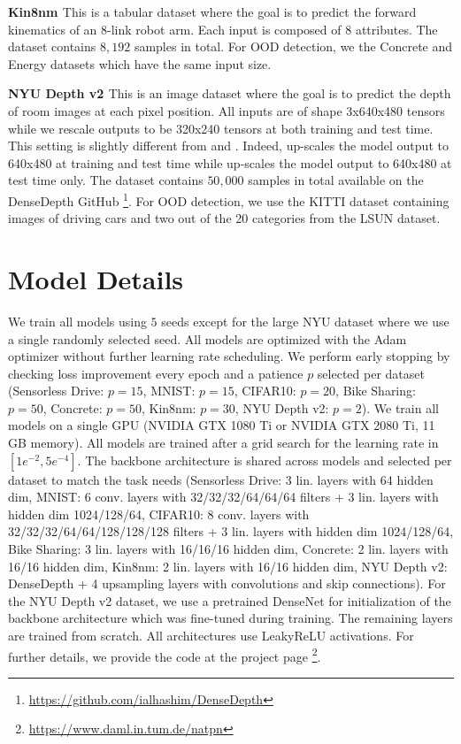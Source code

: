 \textbf{Kin8nm \citep{uci}} This is a tabular dataset where the goal is to predict the forward kinematics of an 8-link robot arm. Each input is composed of $8$ attributes. The dataset contains $8,192$ samples in total. For OOD detection, we the Concrete and Energy datasets which have the same input size.

\textbf{NYU Depth v2 \citep{nyu-depth}} This is an image dataset where the goal is to predict the depth of room images at each pixel position. All inputs are of shape 3x640x480 tensors while we rescale outputs to be 320x240 tensors at both training and test time. This setting is slightly different from \citet{uncertainty-bayesian-computer-vision} and \citet{nyu-depth}. Indeed, \citep{uncertainty-bayesian-computer-vision} up-scales the model output to 640x480 at training and test time while \citep{nyu-depth} up-scales the model output to 640x480 at test time only. The dataset contains $50,000$ samples in total available on the DenseDepth GitHub \footnote{\url{https://github.com/ialhashim/DenseDepth}}. For OOD detection, we use the KITTI \citep{kitti} dataset containing images of driving cars and two out of the 20 categories from the LSUN \citep{lsun} dataset.

\section{Model Details}
\label{sec:model}

We train all models using $5$ seeds except for the large NYU dataset where we use a single randomly selected seed. All models are optimized with the Adam optimizer without further learning rate scheduling. We perform early stopping by checking loss improvement every epoch and a patience $p$ selected per dataset (Sensorless Drive: $p=15$, MNIST: $p=15$, CIFAR10: $p=20$, Bike Sharing: $p=50$, Concrete: $p=50$, Kin8nm: $p=30$, NYU Depth v2: $p=2$). We train all models on a single GPU (NVIDIA GTX 1080 Ti or NVIDIA GTX 2080 Ti, 11 GB memory). All models are trained after a grid search for the learning rate in $[1e^{-2}, 5e^{-4}]$. The backbone architecture is shared across models and selected per dataset to match the task needs (Sensorless Drive: 3 lin. layers with 64 hidden dim, MNIST: 6 conv. layers with 32/32/32/64/64/64 filters + 3 lin. layers with hidden dim 1024/128/64, CIFAR10: 8 conv. layers with 32/32/32/64/64/128/128/128 filters + 3 lin. layers with hidden dim 1024/128/64, Bike Sharing: 3 lin. layers with 16/16/16 hidden dim, Concrete: 2 lin. layers with 16/16 hidden dim, Kin8nm: 2 lin. layers with 16/16 hidden dim, NYU Depth v2: DenseDepth + 4 upsampling layers with convolutions and skip connections). For the NYU Depth v2 dataset, we use a pretrained DenseNet for initialization of the backbone architecture which was fine-tuned during training. The remaining layers are trained from scratch. All architectures use LeakyReLU activations. For further details, we provide the code at the project page \footnote{\url{https://www.daml.in.tum.de/natpn}}.

